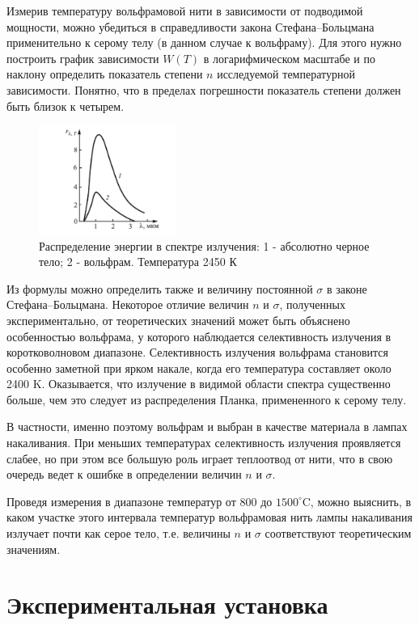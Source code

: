 \documentclass[a4paper,12pt]{article}
\begin{document}
Измерив температуру вольфрамовой нити в зависимости от подводимой мощности, можно убедиться в справедливости закона Стефана–Больцмана применительно к серому телу (в данном случае к вольфраму). Для этого нужно построить график зависимости $W(T)$ в логарифмическом масштабе и по наклону определить показатель степени $n$ исследуемой температурной зависимости. Понятно, что в пределах погрешности показатель степени должен быть близок к четырем.

\begin{figure}[h]
\centering
\includegraphics[width=0.4\textwidth]{img2.png}
\caption{Распределение энергии в спектре излучения: 1 - абсолютно черное тело; 2 - вольфрам. Температура 2450 К}
\end{figure}

Из формулы можно определить также и величину постоянной $\sigma$ в законе Стефана–Больцмана. Некоторое отличие величин $n$ и $\sigma$, полученных экспериментально, от теоретических значений может быть объяснено особенностью вольфрама, у которого наблюдается селективность излучения в коротковолновом диапазоне. Селективность излучения вольфрама становится особенно заметной при ярком накале, когда его температура составляет около 2400 K. Оказывается, что излучение в видимой области спектра существенно больше, чем это следует из распределения Планка, примененного к серому телу.

В частности, именно поэтому вольфрам и выбран в качестве материала в лампах накаливания. При меньших температурах селективность излучения проявляется слабее, но при этом все большую роль играет теплоотвод от нити, что в свою очередь ведет к ошибке в определении величин $n$ и $\sigma$.

Проведя измерения в диапазоне температур от 800 до $1500^\circ$C, можно выяснить, в каком участке этого интервала температур вольфрамовая нить лампы накаливания излучает почти как серое тело, т.е. величины $n$ и $\sigma$ соответствуют теоретическим значениям.

\section{Экспериментальная установка}
\end{document}
